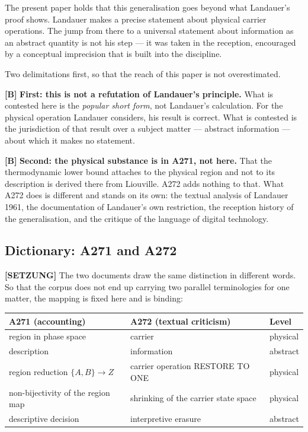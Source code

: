 The present paper holds that this generalisation goes beyond what Landauer's proof
shows. Landauer makes a precise statement about physical carrier operations. The
jump from there to a universal statement about information as an abstract quantity
is not his step --- it was taken in the reception, encouraged by a conceptual
imprecision that is built into the discipline.

Two delimitations first, so that the reach of this paper is not overestimated.

\textbf{[B]} \textbf{First: this is not a refutation of Landauer's principle.} What is
contested here is the \emph{popular short form}, not Landauer's calculation. For
the physical operation Landauer considers, his result is correct. What is
contested is the jurisdiction of that result over a subject matter --- abstract
information --- about which it makes no statement.

\textbf{[B]} \textbf{Second: the physical substance is in A271, not here.} That the
thermodynamic lower bound attaches to the physical region and not to its
description is derived there from Liouville. A272 adds nothing to that. What A272
does is different and stands on its own: the textual analysis of Landauer 1961,
the documentation of Landauer's own restriction, the reception history of the
generalisation, and the critique of the language of digital technology.

\subsection{Dictionary: A271 and A272}
\label{sec:dictionary}

\textbf{[SETZUNG]} The two documents draw the same distinction in different words. So that the
corpus does not end up carrying two parallel terminologies for one matter, the
mapping is fixed here and is binding:

\begin{center}
\small
\begin{tabular}{@{}p{}p{}p{}@{}}
\toprule
\textbf{A271 (accounting)} & \textbf{A272 (textual criticism)} & \textbf{Level} \\
\midrule
region in phase space & carrier & physical \\
description & information & abstract \\
region reduction $\{A,B\}\to Z$ & carrier operation \textup{RESTORE TO ONE} & physical \\
non-bijectivity of the region map & shrinking of the carrier state space & physical \\
descriptive decision & interpretive erasure & abstract \\
\bottomrule
\end{tabular}
\end{center}

